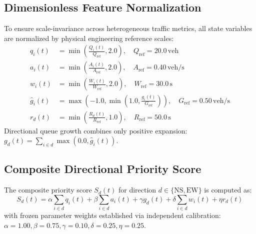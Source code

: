 \documentclass[11pt,journal,onecolumn]{article}
\begin{document}
\subsection{Dimensionless Feature Normalization}
To ensure scale-invariance across heterogeneous traffic metrics, all state variables are normalized by physical engineering reference scales:
\begin{align}
    q_i(t) &= \min\left( \frac{Q_i(t)}{Q_{\text{ref}}}, 2.0 \right), \quad Q_{\text{ref}} = 20.0\,\text{veh} \\
    a_i(t) &= \min\left( \frac{A_i(t)}{A_{\text{ref}}}, 2.0 \right), \quad A_{\text{ref}} = 0.40\,\text{veh/s} \\
    w_i(t) &= \min\left( \frac{W_i(t)}{W_{\text{ref}}}, 2.0 \right), \quad W_{\text{ref}} = 30.0\,\text{s} \\
    \hat{g}_i(t) &= \max\left( -1.0, \min\left( 1.0, \frac{g_i(t)}{G_{\text{ref}}} \right) \right), \quad G_{\text{ref}} = 0.50\,\text{veh/s} \\
    r_d(t) &= \min\left( \frac{R_d(t)}{R_{\text{ref}}}, 1.0 \right), \quad R_{\text{ref}} = 50.0\,\text{s}
\end{align}
Directional queue growth combines only positive expansion: $g_d(t) = \sum_{i \in d} \max(0.0, \hat{g}_i(t))$.

\subsection{Composite Directional Priority Score}
The composite priority score $S_d(t)$ for direction $d \in \{\text{NS}, \text{EW}\}$ is computed as:
\begin{equation}
    S_d(t) = \alpha \sum_{i \in d} q_i(t) + \beta \sum_{i \in d} a_i(t) + \gamma g_d(t) + \delta \sum_{i \in d} w_i(t) + \eta r_d(t)
    \label{eq:priority_score}
\end{equation}
with frozen parameter weights established via independent calibration: $\alpha = 1.00, \beta = 0.75, \gamma = 0.10, \delta = 0.25, \eta = 0.25$.
\end{document}
